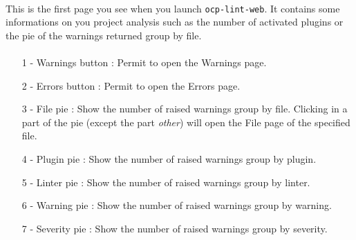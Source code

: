 \documentclass{article}
\begin{document}
\paragraph{}

\vspace{\baselineskip}

\paragraph{}
This is the first page you see when you launch \texttt{ocp-lint-web}. It contains some informations on you project analysis such as the number of activated plugins or the pie of the warnings returned group by file.

\paragraph{}
\begin{itemize}
	\item[1 -] Warnings button : Permit to open the Warnings page.
	\item[2 -] Errors button : Permit to open the Errors page.
    \item[3 -] File pie : Show the number of raised warnings group by file. Clicking in a part of the pie (except the part \textit{other}) will open the File page of the specified file.
    \item[4 -] Plugin pie : Show the number of raised warnings group by plugin.
    \item[5 -] Linter pie : Show the number of raised warnings group by linter.
    \item[6 -] Warning pie : Show the number of raised warnings group by warning.
    \item[7 -] Severity pie : Show the number of raised warnings group by severity.
\end{itemize}
\end{document}
